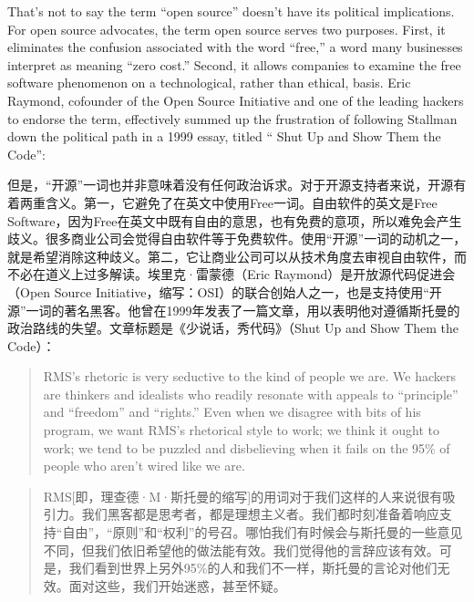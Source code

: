 \ifdefined\vone
\ifdefined\eng
That's not to say the term ``open source'' doesn't have its political implications. For open source advocates, the term open source serves two purposes. First, it eliminates the confusion associated with the word ``free,'' a word many businesses interpret as meaning ``zero cost.'' Second, it allows companies to examine the free software phenomenon on a technological, rather than ethical, basis. Eric Raymond, cofounder of the Open Source Initiative and one of the leading hackers to endorse the term, effectively summed up the frustration of following Stallman down the political path in a 1999 essay, titled `` Shut Up and Show Them the Code'':
\fi

\ifdefined\chs
但是，``开源''一词也并非意味着没有任何政治诉求。对于开源支持者来说，开源有着两重含义。第一，它避免了在英文中使用Free一词。自由软件的英文是Free Software，因为Free在英文中既有自由的意思，也有免费的意项，所以难免会产生歧义。很多商业公司会觉得自由软件等于免费软件。使用``开源''一词的动机之一，就是希望消除这种歧义。第二，它让商业公司可以从技术角度去审视自由软件，而不必在道义上过多解读。埃里克·雷蒙德（Eric Raymond）是开放源代码促进会（Open Source Initiative，缩写：OSI）的联合创始人之一，也是支持使用``开源''一词的著名黑客。他曾在1999年发表了一篇文章，用以表明他对遵循斯托曼的政治路线的失望。文章标题是《少说话，秀代码》（Shut Up and Show Them the Code）：
\fi
\fi

\ifdefined\eng
\begin{quote}
RMS's rhetoric is very seductive to the kind of people we are. We hackers are thinkers and idealists who readily resonate with appeals to ``principle'' and ``freedom'' and ``rights.'' Even when we disagree with bits of his program, we want RMS's rhetorical style to work; we think it ought to work; we tend to be puzzled and disbelieving when it fails on the 95\% of people who aren't wired like we are.
\end{quote}
\fi

\ifdefined\chs
\begin{quote}
RMS[即，理查德·M·斯托曼的缩写]的用词对于我们这样的人来说很有吸引力。我们黑客都是思考者，都是理想主义者。我们都时刻准备着响应支持``自由''，``原则''和``权利''的号召。哪怕我们有时候会与斯托曼的一些意见不同，但我们依旧希望他的做法能有效。我们觉得他的言辞应该有效。可是，我们看到世界上另外95\%的人和我们不一样，斯托曼的言论对他们无效。面对这些，我们开始迷惑，甚至怀疑。
\end{quote}
\fi

